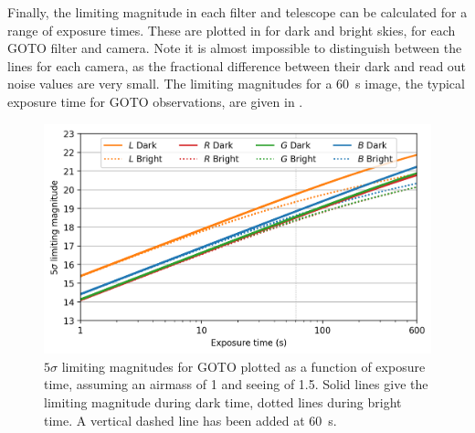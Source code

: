 \begin{colsection}
\begin{colsection}
Finally, the limiting magnitude in each filter and telescope can be calculated for a range of exposure times. These are plotted in  for dark and bright skies, for each GOTO filter and camera. Note it is almost impossible to distinguish between the lines for each camera, as the fractional difference between their dark and read out noise values are very small. The limiting magnitudes for a \SI{60}{\second} image, the typical exposure time for GOTO observations, are given in .

\begin{figure}[t]
    \begin{center}
        \includegraphics[width=\textwidth]{images/throughput/limiting_mag.png}
    \end{center}
    \caption[$5\sigma$ limiting magnitudes for GOTO]{
        $5\sigma$ limiting magnitudes for GOTO plotted as a function of exposure time, assuming an airmass of 1 and seeing of 1.5. Solid lines give the limiting magnitude during dark time, dotted lines during bright time. A vertical dashed line has been added at \SI{60}{\second}.
    }\label{fig:lim_mags}
\end{figure}


\end{colsection}
\end{colsection}
